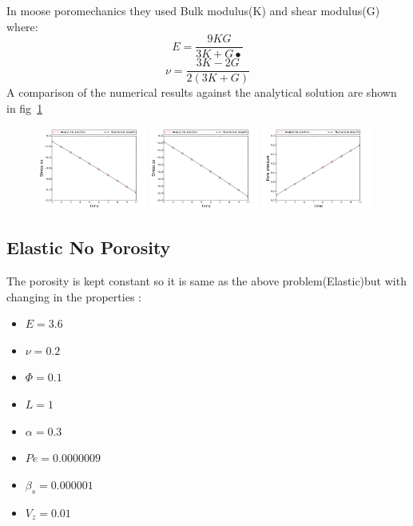 \documentclass[]{scrreprt}
\begin{document}
In moose poromechanics they used  Bulk modulus(K) and shear modulus(G) where:\\

\begin{equation}
E=\frac{9KG}{3K+G•}
\end{equation}
\begin{equation}
\nu=\frac{3K-2G}{2(3K+G)}
\end{equation}
A comparison of the numerical results against the analytical solution are shown in fig~\ref{fig:benchmark7_Elastic}
\begin{figure}
\label{fig:benchmark7_Elastic}
  \centering
  \includegraphics[width=0.32\textwidth]{benchmark_7_HM/benchmark_7_HM_bench_HM_elastic_stress_xx}
  \includegraphics[width=0.32\textwidth]{benchmark_7_HM/benchmark_7_HM_bench_HM_elastic_stress_zz}
  \includegraphics[width=0.32\textwidth]{benchmark_7_HM/benchmark_7_HM_bench_HM_elastic_p0}
 \end{figure}
 
\subsection{Elastic No Porosity }

The porosity is kept constant so it is same as the above problem(Elastic)but with changing in the properties :
\begin{itemize}
\item  $E=3.6$\
\item  $\nu =0.2$\
\item $\Phi=0.1$\
\item $L=1$\
\item  $\alpha=0.3$\
\item  $Pe=0.0000009$\
\item  $\beta_s=0.000001$\
\item  $V_z =0.01$\
\end{itemize}
\end{document}
